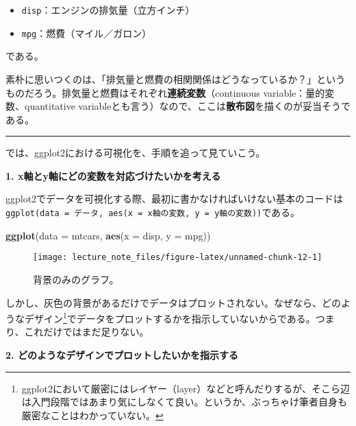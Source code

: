 \documentclass[]{book}
\newenvironment{Shaded}{\begin{snugshade}}{\end{snugshade}}
\newcommand{\KeywordTok}[1]{\textcolor[rgb]{0.13,0.29,0.53}{\textbf{#1}}}
\newcommand{\DataTypeTok}[1]{\textcolor[rgb]{0.13,0.29,0.53}{#1}}
\newcommand{\NormalTok}[1]{#1}
\let\rmarkdownfootnote\footnote%
\def\footnote{\protect\rmarkdownfootnote}
\begin{document}
\begin{itemize}
\item
  \texttt{disp}：エンジンの排気量（立方インチ）
\item
  \texttt{mpg}：燃費（マイル／ガロン）
\end{itemize}

である。

素朴に思いつくのは、「排気量と燃費の相関関係はどうなっているか？」というものだろう。排気量と燃費はそれぞれ\textbf{連続変数}（continuous
variable：量的変数、quantitative
variableとも言う）なので、ここは\textbf{散布図}を描くのが妥当そうである。

\begin{center}\rule{0.5\linewidth}{\linethickness}\end{center}

では、ggplot2における可視化を、手順を追って見ていこう。

\textbf{1. x軸とy軸にどの変数を対応づけたいかを考える}

ggplot2でデータを可視化する際、最初に書かなければいけない基本のコードは\texttt{ggplot(data\ =\ データ,\ aes(x\ =\ x軸の変数,\ y\ =\ y軸の変数))}である。



\begin{Shaded}
\begin{Highlighting}[]
\KeywordTok{ggplot}\NormalTok{(}\DataTypeTok{data =}\NormalTok{ mtcars, }\KeywordTok{aes}\NormalTok{(}\DataTypeTok{x =}\NormalTok{ disp, }\DataTypeTok{y =}\NormalTok{ mpg))}
\end{Highlighting}
\end{Shaded}

\begin{figure}

{\centering \texttt{[image: lecture\_note\_files/figure-latex/unnamed-chunk-12-1]} 

}

\caption{背景のみのグラフ。}\label{fig:unnamed-chunk-12}
\end{figure}

しかし、灰色の背景があるだけでデータはプロットされない。なぜなら、どのようなデザイン\footnote{ggplot2において厳密にはレイヤー（layer）などと呼んだりするが、そこら辺は入門段階ではあまり気にしなくて良い。というか、ぶっちゃけ筆者自身も厳密なことはわかっていない。}でデータをプロットするかを指示していないからである。つまり、これだけではまだ足りない。

\textbf{2. どのようなデザインでプロットしたいかを指示する}
\end{document}
